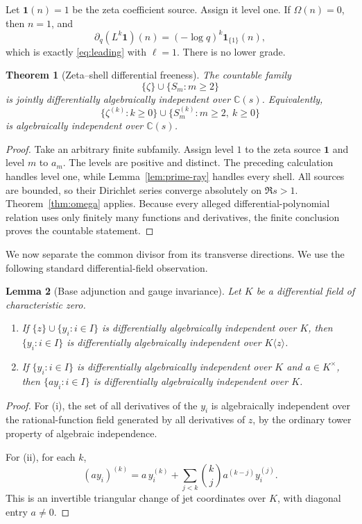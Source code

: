 \documentclass[11pt]{article}
\newtheorem{theorem}{Theorem}[section]
\newtheorem{lemma}[theorem]{Lemma}
\theoremstyle{definition}
\theoremstyle{remark}
\newcommand{\C}{\mathbb C}
\begin{document}
Let \(\mathbf 1(n)=1\) be the zeta coefficient source.  Assign it level one.  If
\(\Omega(n)=0\), then \(n=1\), and
\[
 \partial_q(L^k\mathbf1)(n)
 =(-\log q)^k\mathbf1_{\{1\}}(n),
\]
which is exactly \eqref{eq:leading} with \(\ell=1\).  There is no lower grade.

\begin{theorem}[Zeta--shell differential freeness]\label{thm:zeta-shell-free}
The countable family
\[
 \{\zeta\}\cup\{S_m:m\geq2\}
\]
is jointly differentially algebraically independent over \(\C(s)\).  Equivalently,
\[
 \{\zeta^{(k)}:k\geq0\}
 \cup
 \{S_m^{(k)}:m\geq2,\ k\geq0\}
 \tag{5.1}
\]
is algebraically independent over \(\C(s)\).
\end{theorem}

\begin{proof}
Take an arbitrary finite subfamily.  Assign level \(1\) to the zeta source \(\mathbf1\) and
level \(m\) to \(a_m\).  The levels are positive and distinct.  The preceding calculation
handles level one, while Lemma~\ref{lem:prime-ray} handles every shell.  All sources are bounded,
so their Dirichlet series converge absolutely on \(\Re s>1\).  Theorem~\ref{thm:omega} applies.
Because every alleged differential-polynomial relation uses only finitely many functions and
derivatives, the finite conclusion proves the countable statement.
\end{proof}

We now separate the common divisor from its transverse directions.  We use the following
standard differential-field observation.

\begin{lemma}[Base adjunction and gauge invariance]\label{lem:gauge}
Let \(K\) be a differential field of characteristic zero.
\begin{enumerate}[label=\textup{(\roman*)}]
\item If \(\{z\}\cup\{y_i:i\in I\}\) is differentially algebraically independent over \(K\),
then \(\{y_i:i\in I\}\) is differentially algebraically independent over
\(K\langle z\rangle\).
\item If \(\{y_i:i\in I\}\) is differentially algebraically independent over \(K\) and
\(a\in K^\times\), then \(\{ay_i:i\in I\}\) is differentially algebraically independent over
\(K\).
\end{enumerate}
\end{lemma}

\begin{proof}
For (i), the set of all derivatives of the \(y_i\) is algebraically independent over the
rational-function field generated by all derivatives of \(z\), by the ordinary tower property
of algebraic independence.

For (ii), for each \(k\),
\[
 (ay_i)^{(k)}
 =a\,y_i^{(k)}
 +\sum_{j<k}\binom{k}{j}a^{(k-j)}y_i^{(j)}.
\]
This is an invertible triangular change of jet coordinates over \(K\), with diagonal entry
\(a\ne0\).
\end{proof}
\end{document}
